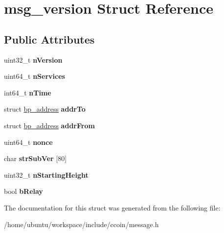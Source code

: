 \hypertarget{structmsg__version}{\section{msg\-\_\-version Struct Reference}
\label{structmsg__version}
}
\subsection*{Public Attributes}
\begin{DoxyCompactItemize}
\item 
\hypertarget{structmsg__version_ad6fae9596aaa57ce98f2bc0866a31b61}{uint32\-\_\-t {\bfseries n\-Version}}\label{structmsg__version_ad6fae9596aaa57ce98f2bc0866a31b61}

\item 
\hypertarget{structmsg__version_a3ea80e2dc1acdc13b1730672171894cc}{uint64\-\_\-t {\bfseries n\-Services}}\label{structmsg__version_a3ea80e2dc1acdc13b1730672171894cc}

\item 
\hypertarget{structmsg__version_a93a89276795da0fcb1f31ce0b95b3c26}{int64\-\_\-t {\bfseries n\-Time}}\label{structmsg__version_a93a89276795da0fcb1f31ce0b95b3c26}

\item 
\hypertarget{structmsg__version_a0d2d56c2f80a93bbbc6dfd880ff80ded}{struct \hyperlink{structbp__address}{bp\-\_\-address} {\bfseries addr\-To}}\label{structmsg__version_a0d2d56c2f80a93bbbc6dfd880ff80ded}

\item 
\hypertarget{structmsg__version_ae4a37878999842684cc78f5a7946e10b}{struct \hyperlink{structbp__address}{bp\-\_\-address} {\bfseries addr\-From}}\label{structmsg__version_ae4a37878999842684cc78f5a7946e10b}

\item 
\hypertarget{structmsg__version_a6f8eb300477d9b2e8826d4d7b1315dc0}{uint64\-\_\-t {\bfseries nonce}}\label{structmsg__version_a6f8eb300477d9b2e8826d4d7b1315dc0}

\item 
\hypertarget{structmsg__version_ad483ea965fe4866bd98307f0eefb717a}{char {\bfseries str\-Sub\-Ver} \mbox{[}80\mbox{]}}\label{structmsg__version_ad483ea965fe4866bd98307f0eefb717a}

\item 
\hypertarget{structmsg__version_a0f0ea2db22e765843228dcd9541e822e}{uint32\-\_\-t {\bfseries n\-Starting\-Height}}\label{structmsg__version_a0f0ea2db22e765843228dcd9541e822e}

\item 
\hypertarget{structmsg__version_a94551b97cf33fc93dfdaf14d0d5537db}{bool {\bfseries b\-Relay}}\label{structmsg__version_a94551b97cf33fc93dfdaf14d0d5537db}

\end{DoxyCompactItemize}


The documentation for this struct was generated from the following file\-:\begin{DoxyCompactItemize}
\item 
/home/ubuntu/workspace/include/ccoin/message.\-h\end{DoxyCompactItemize}

